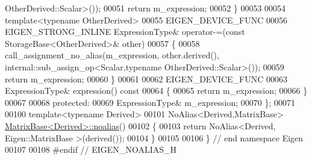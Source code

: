 \begin{DoxyCode}
       OtherDerived::Scalar>());
00051       \textcolor{keywordflow}{return} m\_expression;
00052     \}
00053     
00054     \textcolor{keyword}{template}<\textcolor{keyword}{typename} OtherDerived>
00055     EIGEN\_DEVICE\_FUNC
00056     EIGEN\_STRONG\_INLINE ExpressionType& operator-=(\textcolor{keyword}{const} StorageBase<OtherDerived>& other)
00057     \{
00058       call\_assignment\_no\_alias(m\_expression, other.derived(), internal::sub\_assign\_op<Scalar,typename
       OtherDerived::Scalar>());
00059       \textcolor{keywordflow}{return} m\_expression;
00060     \}
00061 
00062     EIGEN\_DEVICE\_FUNC
00063     ExpressionType& expression()\textcolor{keyword}{ const}
00064 \textcolor{keyword}{    }\{
00065       \textcolor{keywordflow}{return} m\_expression;
00066     \}
00067 
00068   \textcolor{keyword}{protected}:
00069     ExpressionType& m\_expression;
00070 \};
00071 
00100 \textcolor{keyword}{template}<\textcolor{keyword}{typename} Derived>
00101 NoAlias<Derived,MatrixBase> \hyperlink{group___core___module_a2c1085de7645f23f240876388457da0b}{MatrixBase<Derived>::noalias}()
00102 \{
00103   \textcolor{keywordflow}{return} NoAlias<Derived, Eigen::MatrixBase >(derived());
00104 \}
00105 
00106 \} \textcolor{comment}{// end namespace Eigen}
00107 
00108 \textcolor{preprocessor}{#endif // EIGEN\_NOALIAS\_H}
\end{DoxyCode}
